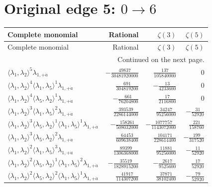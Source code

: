 \section{Original edge 5: $0\to 6$}
\begin{longtable}{@{}lrrr@{}}
\toprule
Complete monomial & Rational & $\zeta(3)$ & $\zeta(5)$ \\
\midrule\endfirsthead
\toprule Complete monomial & Rational & $\zeta(3)$ & $\zeta(5)$ \\
\midrule\endhead
\midrule\multicolumn{4}{r}{Continued on the next page.}\\\endfoot
\bottomrule\endlastfoot
$\langle\lambda_1,\lambda_2\rangle^{5}\lambda_{1,+\dot a}$ & $-\frac{49837}{30481920000}$ & $\frac{137}{105840000}$ & $0$ \\
$\langle\lambda_1,\lambda_2\rangle^{4}\langle\lambda_1,\lambda_5\rangle^{1}\lambda_{1,+\dot a}$ & $\frac{691}{304819200}$ & $-\frac{13}{4233600}$ & $0$ \\
$\langle\lambda_1,\lambda_2\rangle^{4}\langle\lambda_5,\lambda_2\rangle^{1}\lambda_{1,+\dot a}$ & $-\frac{661}{76204800}$ & $\frac{17}{2116800}$ & $0$ \\
$\langle\lambda_1,\lambda_2\rangle^{3}\langle\lambda_1,\lambda_5\rangle^{2}\lambda_{1,+\dot a}$ & $\frac{393539}{2286144000}$ & $\frac{34247}{95256000}$ & $-\frac{31}{52920}$ \\
$\langle\lambda_1,\lambda_2\rangle^{3}\langle\lambda_5,\lambda_2\rangle^{1}\langle\lambda_1,\lambda_5\rangle^{1}\lambda_{1,+\dot a}$ & $-\frac{158261}{508032000}$ & $-\frac{1077757}{1143072000}$ & $\frac{221}{158760}$ \\
$\langle\lambda_1,\lambda_2\rangle^{3}\langle\lambda_5,\lambda_2\rangle^{2}\lambda_{1,+\dot a}$ & $\frac{64453}{609638400}$ & $\frac{104171}{228614400}$ & $-\frac{199}{317520}$ \\
$\langle\lambda_1,\lambda_2\rangle^{2}\langle\lambda_1,\lambda_5\rangle^{3}\lambda_{1,+\dot a}$ & $\frac{89399}{1306368000}$ & $\frac{11881}{95256000}$ & $-\frac{11}{52920}$ \\
$\langle\lambda_1,\lambda_2\rangle^{2}\langle\lambda_5,\lambda_2\rangle^{1}\langle\lambda_1,\lambda_5\rangle^{2}\lambda_{1,+\dot a}$ & $-\frac{35519}{1828915200}$ & $-\frac{2617}{9525600}$ & $\frac{17}{52920}$ \\
$\langle\lambda_1,\lambda_2\rangle^{2}\langle\lambda_5,\lambda_2\rangle^{2}\langle\lambda_1,\lambda_5\rangle^{1}\lambda_{1,+\dot a}$ & $\frac{41917}{114307200}$ & $\frac{37871}{38102400}$ & $-\frac{79}{52920}$ \\

\end{longtable}

